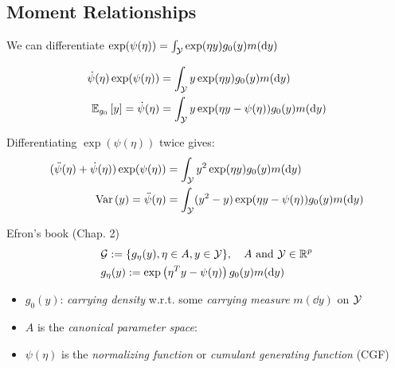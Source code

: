 \subsection{Moment Relationships}

We can differentiate $\exp(\psi(\eta)) = \int_{\mathcal{Y}} \exp(\eta y) g_0(y)m(\dd{y})$

\begin{align*}
    \dot{\psi}(\eta) \exp(\psi(\eta)) &= \int_{\Yc} y\exp(\eta y) g_0(y) m(\dd{y}) \\
    \ERWi{g_0}{y} = \dot{\psi}(\eta) &= \int_{\Yc} y\exp(\eta y - \psi(\eta)) g_0(y) m(\dd{y}) 
\end{align*}

Differentiating $\exp(\psi(\eta))$ twice gives:
\begin{align*}
    (\ddot{\psi}(\eta) + \dot{\psi}(\eta)) \exp(\psi(\eta))
        &= \int_{\Yc} y^2 \exp(\eta y) g_0(y) m(\dd{y}) \\
    \VAR{y} = \ddot{\psi}(\eta) &= \int_{\Yc} (y^2 - y)\exp(\eta y - \psi(\eta)) g_0(y) m(\dd{y})
\end{align*}


Efron's book (Chap. 2)
\begin{align*}
    &\Gc := \{g_{\eta}(y), \eta \in A, y \in \Yc \}, \quad A \text{ and } \Yc \in \Rf^p \\
    &g_{\eta}(y) := \exp\left(\eta^T y - \psi(\eta)\right) g_0(y) m(\dd{y})
\end{align*}
\begin{itemize}
    \item $g_0(y)$: \textit{carrying density} w.r.t. some \textit{carrying measure} $m(\dd{y})$ on $\mathcal{Y}$
    \item $A$ is the \textit{canonical parameter space}:
    \item $\psi(\eta)$ is the \textit{normalizing function} or \textit{cumulant generating function} (CGF)
\end{itemize}